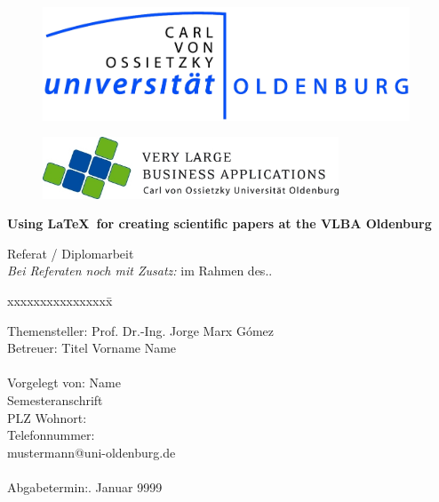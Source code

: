 \documentclass[11pt]{scrartcl}
\begin{document}
\begin{titlepage}
  \begin{centering}
  \begin{figure}[h!]
    \centering
    \includegraphics[width=310pt]{UOL-Logo}    %
  \end{figure}

  \vspace*{-0.8cm}

  \begin{figure}[h!]
    \centering
    \includegraphics[width=250pt]{VLBA-Logo}    %
  \end{figure}

  \vspace*{0.4cm}
  
  \textsf{\Huge \textbf{Using \LaTeX\ for creating scientific papers at the VLBA Oldenburg\\}}

  \vspace*{0.5cm}
  \noindent Referat / Diplomarbeit\\
  \emph{Bei Referaten noch mit Zusatz:} im Rahmen des..     %

  \end{centering}
  
  \vspace*{1.5cm}
  \begin{tabbing}
  xxxxxxxxxxxxxxxx\= \kill
  
  \small Themensteller:\> Prof. Dr.-Ing. Jorge Marx Gómez\\
  \small Betreuer:\> Titel Vorname Name\\\\

  \small Vorgelegt von: \>Name\\
  \small \>Semesteranschrift\\
  \small \>PLZ Wohnort:\\
  \small \>Telefonnummer:\\
  \small \>mustermann@uni-oldenburg.de\\\\

  \small Abgabetermin:. Januar 9999
  \end{tabbing}
\end{titlepage}
\end{document}
